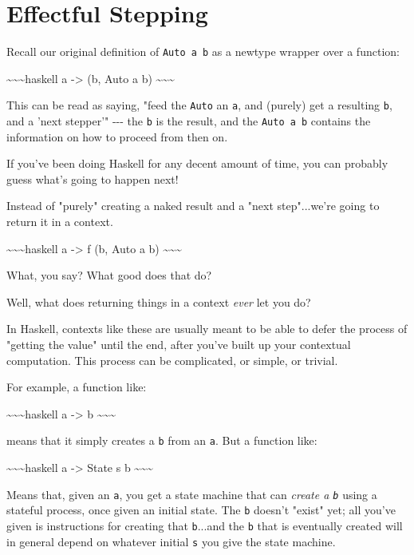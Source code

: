 \documentclass[]{article}
\begin{document}
\section{Effectful Stepping}

Recall our original definition of \texttt{Auto\ a\ b} as a newtype wrapper over
a function:

\textasciitilde{}\textasciitilde{}\textasciitilde{}haskell a -\textgreater{} (b,
Auto a b) \textasciitilde{}\textasciitilde{}\textasciitilde{}

This can be read as saying, "feed the \texttt{Auto} an \texttt{a}, and (purely)
get a resulting \texttt{b}, and a 'next stepper'" -\/-\/- the \texttt{b} is the
result, and the \texttt{Auto\ a\ b} contains the information on how to proceed
from then on.

If you've been doing Haskell for any decent amount of time, you can probably
guess what's going to happen next!

Instead of "purely" creating a naked result and a "next step"...we're going to
return it in a context.

\textasciitilde{}\textasciitilde{}\textasciitilde{}haskell a -\textgreater{} f
(b, Auto a b) \textasciitilde{}\textasciitilde{}\textasciitilde{}

What, you say? What good does that do?

Well, what does returning things in a context \emph{ever} let you do?

In Haskell, contexts like these are usually meant to be able to defer the
process of "getting the value" until the end, after you've built up your
contextual computation. This process can be complicated, or simple, or trivial.

For example, a function like:

\textasciitilde{}\textasciitilde{}\textasciitilde{}haskell a -\textgreater{} b
\textasciitilde{}\textasciitilde{}\textasciitilde{}

means that it simply creates a \texttt{b} from an \texttt{a}. But a function
like:

\textasciitilde{}\textasciitilde{}\textasciitilde{}haskell a -\textgreater{}
State s b \textasciitilde{}\textasciitilde{}\textasciitilde{}

Means that, given an \texttt{a}, you get a state machine that can \emph{create a
\texttt{b}} using a stateful process, once given an initial state. The
\texttt{b} doesn't "exist" yet; all you've given is instructions for creating
that \texttt{b}...and the \texttt{b} that is eventually created will in general
depend on whatever initial \texttt{s} you give the state machine.
\end{document}
